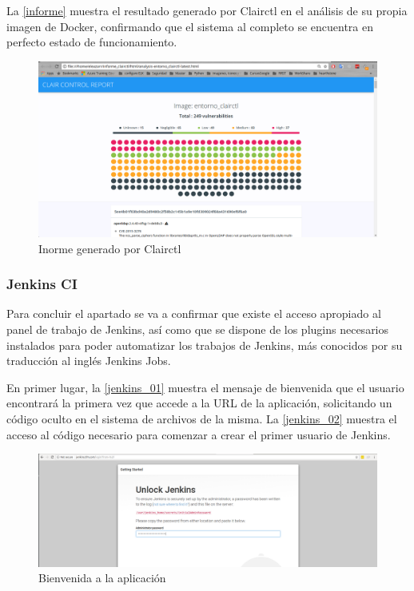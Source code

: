 La \autoref{informe} muestra el resultado generado por Clairctl en el análisis de su propia imagen de Docker, confirmando que el sistema al completo se encuentra en perfecto estado de funcionamiento.

\begin{figure}[htbp]
	\centering
	\includegraphics[width=1.0\linewidth]
	{desarrollo/figuras/informe_clairctl.png}
	\caption{Inorme generado por Clairctl}
	\label{informe}
\end{figure}

\subsubsection{Jenkins CI}

Para concluir el apartado se va a confirmar que existe el acceso apropiado al panel de trabajo de Jenkins, así como que se dispone de los plugins necesarios instalados para poder automatizar los trabajos de Jenkins, más conocidos por su traducción al inglés Jenkins Jobs.

En primer lugar, la \autoref{jenkins_01} muestra el mensaje de bienvenida que el usuario encontrará la primera vez que accede a la URL de la aplicación, solicitando un código oculto en el sistema de archivos de la misma. La \autoref{jenkins_02} muestra el acceso al código necesario para comenzar a crear el primer usuario de Jenkins.


\begin{figure}[htbp]
	\centering
	\includegraphics[width=1.0\linewidth]
	{desarrollo/figuras/jenkins_01.png}
	\caption{Bienvenida a la aplicación}
	\label{jenkins_01}
\end{figure}



